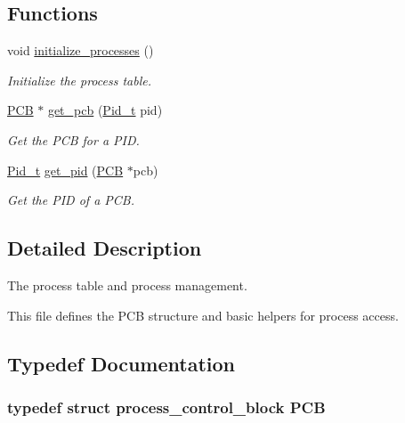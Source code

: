 \subsection*{Functions}
\begin{DoxyCompactItemize}
\item 
void \hyperlink{group__proc_ga82948cbeb57bb0b6e15d1f14f06a2db3}{initialize\+\_\+processes} ()
\begin{DoxyCompactList}\small\item\em Initialize the process table. \end{DoxyCompactList}\item 
\hyperlink{group__proc_gadf327f09ee935cf1734c14e8849f0421}{P\+CB} $\ast$ \hyperlink{group__proc_ga10cf45ea8bc92b00bd1f25553b9cf5c8}{get\+\_\+pcb} (\hyperlink{group__syscalls_gafac07f3170763932fac97b6eab2c3984}{Pid\+\_\+t} pid)
\begin{DoxyCompactList}\small\item\em Get the P\+CB for a P\+ID. \end{DoxyCompactList}\item 
\hyperlink{group__syscalls_gafac07f3170763932fac97b6eab2c3984}{Pid\+\_\+t} \hyperlink{group__proc_ga110e884cb053244b18d1058751a78cfe}{get\+\_\+pid} (\hyperlink{group__proc_gadf327f09ee935cf1734c14e8849f0421}{P\+CB} $\ast$pcb)
\begin{DoxyCompactList}\small\item\em Get the P\+ID of a P\+CB. \end{DoxyCompactList}\end{DoxyCompactItemize}


\subsection{Detailed Description}
The process table and process management. 

This file defines the P\+CB structure and basic helpers for process access. 

\subsection{Typedef Documentation}
\subsubsection[{\texorpdfstring{P\+CB}{PCB}}]{\setlength{\rightskip}{0pt plus 5cm}typedef struct {\bf process\+\_\+control\+\_\+block}  {\bf P\+CB}}\hypertarget{group__proc_gadf327f09ee935cf1734c14e8849f0421}{}\label{group__proc_gadf327f09ee935cf1734c14e8849f0421}


